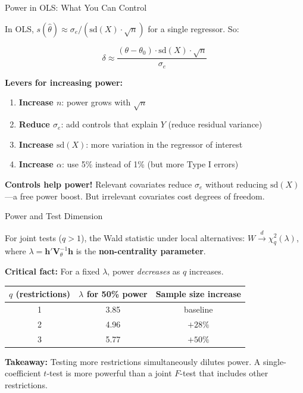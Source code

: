 \documentclass[handout, aspectratio=169]{beamer}
\numberwithin{equation}{section}
\begin{document}
\begin{frame}{Power in OLS: What You Can Control}

In OLS, $s(\hat{\theta}) \approx \sigma_e / (\text{sd}(X) \cdot \sqrt{n})$ for a single regressor. So:

$$\delta \approx \frac{(\theta - \theta_0) \cdot \text{sd}(X) \cdot \sqrt{n}}{\sigma_e}$$

\pause
\smallskip

\textbf{Levers for increasing power:}
\begin{enumerate}
\item \textbf{Increase $n$}: power grows with $\sqrt{n}$
\item \textbf{Reduce $\sigma_e$}: add controls that explain $Y$ (reduce residual variance)
\item \textbf{Increase $\text{sd}(X)$}: more variation in the regressor of interest
\item \textbf{Increase $\alpha$}: use 5\% instead of 1\% (but more Type I errors)
\end{enumerate}

\pause
\smallskip

\begin{tcolorbox}[colback=blue!5, colframe=blue!50]
\textbf{Controls help power!} Relevant covariates reduce $\sigma_e$ without reducing $\text{sd}(X)$---a free power boost.  But irrelevant covariates cost degrees of freedom.
\end{tcolorbox}
\end{frame}

\begin{frame}{Power and Test Dimension}

For joint tests ($q > 1$), the Wald statistic under local alternatives:
$W \xrightarrow{d} \chi^2_q(\lambda)$, where $\lambda = \bm{h}'\bm{V}_\theta^{-1}\bm{h}$ is the \textbf{non-centrality parameter}.

\pause
\smallskip

\textbf{Critical fact:} For a fixed $\lambda$, power \emph{decreases} as $q$ increases.

\pause

\begin{center}
\renewcommand{\arraystretch}{1.2}
\begin{tabular}{ccc}
\toprule
$q$ (restrictions) & $\lambda$ for 50\% power & Sample size increase \\
\midrule
1 & 3.85 & baseline \\
2 & 4.96 & $+28\%$ \\
3 & 5.77 & $+50\%$ \\
\bottomrule
\end{tabular}
\end{center}

\pause
\smallskip

\textbf{Takeaway:} Testing more restrictions simultaneously dilutes power.  A single-coefficient $t$-test is more powerful than a joint $F$-test that includes other restrictions.
\end{frame}
\end{document}
